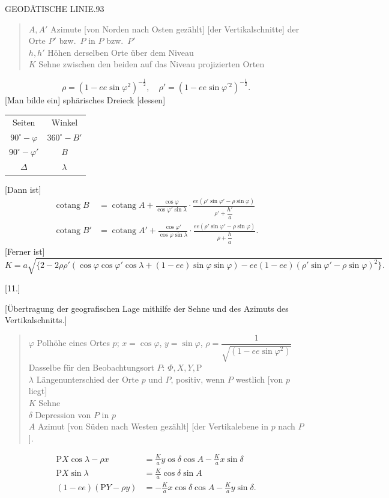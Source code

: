 \clearpage
\noindent\mbox{}\hfill GEODÄTISCHE LINIE.\hfill 93\par
\begin{quote}
$A,A'$ Azimute [von Norden nach Osten gezählt] [der Vertikalschnitte] der Orte $P'$ bzw.\ $P$ in $P$ bzw.\ $P'$\\
$h,h'$ Höhen derselben Orte über dem Niveau\\
$K$ Sehne zwischen den beiden auf das Niveau projizierten Orten
\end{quote}
\[
\rho=(1-ee\sin\varphi^2)^{-\frac12},\quad\rho'=(1-ee\sin\varphi^{\prime2})^{-\frac12}.
\]
[Man bilde ein] sphärisches Dreieck [dessen]
\begin{center}
\begin{tabular}{cc}
Seiten&Winkel\\
$90^\circ-\varphi$&$360^\circ-B'$\\
$90^\circ-\varphi'$&$B$\\
$\Delta$&$\lambda$
\end{tabular}
\end{center}
[Dann ist]
\[
\begin{aligned}
\operatorname{cotang}B&=\operatorname{cotang}A+\frac{\cos\varphi}{\cos\varphi'\sin\lambda}\cdot\frac{ee(\rho'\sin\varphi'-\rho\sin\varphi)}{\rho'+\dfrac{h'}a}\\
\operatorname{cotang}B'&=\operatorname{cotang}A'+\frac{\cos\varphi'}{\cos\varphi\sin\lambda}\cdot\frac{ee(\rho'\sin\varphi'-\rho\sin\varphi)}{\rho+\dfrac ha}.
\end{aligned}
\]
[Ferner ist]
\[
K=a\sqrt{\{2-2\rho\rho'(\cos\varphi\cos\varphi'\cos\lambda+(1-ee)\sin\varphi\sin\varphi)-ee(1-ee)(\rho'\sin\varphi'-\rho\sin\varphi)^2\}}.
\]
\begin{center}[11.]\end{center}
\begin{center}[Übertragung der geografischen Lage mithilfe der Sehne und des Azimuts des Vertikalschnitts.]\end{center}
\begin{quote}
$\varphi$ Polhöhe eines Ortes $p$; $x=\cos\varphi$, $y=\sin\varphi$, $\rho=\dfrac1{\sqrt{(1-ee\sin\varphi^2)}}$\\
Dasselbe für den Beobachtungsort $P$: $\Phi,X,Y,\mathrm P$\\
$\lambda$ Längenunterschied der Orte $p$ und $P$, positiv, wenn $P$ westlich [von $p$ liegt]\\
$K$ Sehne\\
$\delta$ Depression von $P$ in $p$\\
$A$ Azimut [von Süden nach Westen gezählt] [der Vertikalebene in $p$ nach $P$].
\end{quote}
\[
\begin{aligned}
\mathrm PX\cos\lambda-\rho x&=\frac Ka y\mathop{\dot{\mathrm c}\mathrm{os}}\delta\cos A-\frac Ka x\sin\delta\\
\mathrm PX\sin\lambda&=\frac Ka\cos\delta\sin A\\
(1-ee)(\mathrm PY-\rho y)&=-\frac Ka x\cos\delta\cos A-\frac Ka y\sin\delta.
\end{aligned}
\]

